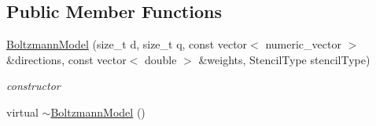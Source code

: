 \subsection*{Public Member Functions}
\begin{DoxyCompactItemize}
\item 
\hyperlink{classnatrium_1_1BoltzmannModel_a550a1326623d766f529a0d60a7743588}{Boltzmann\-Model} (size\-\_\-t d, size\-\_\-t q, const vector$<$ numeric\-\_\-vector $>$ \&directions, const vector$<$ double $>$ \&weights, Stencil\-Type stencil\-Type)
\begin{DoxyCompactList}\small\item\em constructor \end{DoxyCompactList}\item 
\hypertarget{classnatrium_1_1BoltzmannModel_ac2e3dabcbe15c1e37ff09ec1c53dafa5}{virtual \hyperlink{classnatrium_1_1BoltzmannModel_ac2e3dabcbe15c1e37ff09ec1c53dafa5}{$\sim$\-Boltzmann\-Model} ()}\label{classnatrium_1_1BoltzmannModel_ac2e3dabcbe15c1e37ff09ec1c53dafa5}


\end{DoxyCompactItemize}

